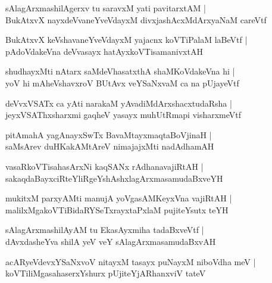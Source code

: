 \documentclass[twoside,12pt,openright]{book}
\newcounter{shloka}[chapter]
\begin{document}
\begin{shloka}%
sAlagArxmashilAgerxv tu saravxM yati pavitarxtAM |\\
BukAtxvX nayxdeVvaneYveVdayxM divxjashAcxMdArxyaNaM careVtf
\end{shloka}

\begin{shloka}%
BukAtxvX keVshavaneYveVdayxM yajacnx koVTiPalaM laBeVtf |\\
pAdoVdakeVna deVvasayx hatAyxkoVTisamanivxtAH 
\end{shloka}

\begin{shloka}%
shudhayxMti nAtarx saMdeVhasatxthA shaMKoVdakeVna hi |\\
yoV hi mAheVshavxroV BUtAvx veYSaNxvaM ca na pUjayeVtf 
\end{shloka}

\begin{shloka}%
deVvxVSATx ca yAti narakaM yAvadiMdArxshacxtudaRsha |\\
jeyxVSAThxsharxmi gaqheV yasayx muhUtRmapi visharxmeVtf
\end{shloka}

\begin{shloka}%
pitAmahA yagAnayxSwTx BavaMtayxmaqtaBoVjinaH |\\
saMsArev duHKakAMtAreV nimajajxMti nadAdhamAH 
\end{shloka}

\begin{shloka}%
vasaRkoVTisahasArxNi kaqSANx rAdhanavajiRtAH |\\
sakaqdaBayxciRteYliRgeYshAshxlagArxmasamudaBxveYH
\end{shloka}

\begin{shloka}%
mukitxM parxyAMti manujA yoVgasAMKeyxVna vajiRtAH |\\
malilxMgakoVTiBidaRYSeTxrayxtaPxlaM pujiteYsutx teYH
\end{shloka}

\begin{shloka}%
sAlagArxmashilAyAM tu EkasAyxmiha tadaBxveVtf |\\
dAvxdasheYva shilA yeV veY sAlagArxmasamudaBxvAH
\end{shloka}

\begin{shloka}%
acARyeVdevxYSaNxvoV nitayxM tasayx puNayxM niboVdha meV |\\
koVTiliMgasahaserxYshurx pUjiteYjARhanxviV tateV
\end{shloka}
\end{document}
